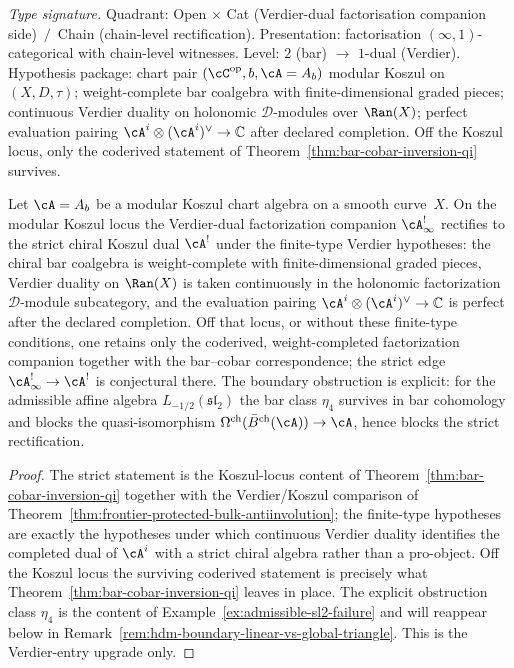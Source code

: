 \begin{proposition}
\label{prop:hdm-upgrade-rectification}
\emph{Type signature.} Quadrant: Open $\times$ Cat (Verdier-dual
factorisation companion side) $\,/\,$ Chain (chain-level rectification).
Presentation: factorisation $(\infty,1)$-categorical with chain-level
witnesses. Level: $2$ (bar) $\to$ $1$-dual (Verdier). Hypothesis
package: chart pair $(\cC^{\mathrm{op}}, b, \cA = A_b)$ modular
Koszul on $(X,D,\tau)$; weight-complete bar coalgebra with
finite-dimensional graded pieces; continuous Verdier duality on
holonomic $\mathcal{D}$-modules over $\Ran(X)$; perfect evaluation
pairing $\cA^i\otimes(\cA^i)^\vee\to\mathbb{C}$ after declared
completion. Off the Koszul locus, only the coderived statement
of Theorem~\textup{\ref{thm:bar-cobar-inversion-qi}} survives.

Let $\cA = A_b$ be a modular Koszul chart algebra on a smooth
curve~$X$. On the modular Koszul locus the Verdier-dual factorization
companion
$\cA^{!}_\infty$ rectifies to the strict chiral Koszul dual
$\cA^!$ under the finite-type Verdier hypotheses: the chiral bar
coalgebra is weight-complete with finite-dimensional graded pieces,
Verdier duality on $\Ran(X)$ is taken continuously in the holonomic
factorization $\mathcal D$-module subcategory, and the evaluation
pairing $\cA^i\otimes(\cA^i)^\vee\to\mathbb C$ is perfect after the
declared completion. Off that locus, or without these finite-type
conditions, one retains only the coderived, weight-completed
factorization companion together with the bar--cobar correspondence;
the strict edge $\cA^{!}_\infty \to \cA^!$ is conjectural there. The
boundary obstruction is explicit: for the admissible affine algebra
$L_{-1/2}(\mathfrak{sl}_2)$ the bar class $\eta_4$ survives in bar
cohomology and blocks the quasi-isomorphism
$\Omega^{\mathrm{ch}}(\bar B^{\mathrm{ch}}(\cA))\to\cA$, hence blocks
the strict rectification.
\end{proposition}

\begin{proof}
The strict statement is the Koszul-locus content of
Theorem~\ref{thm:bar-cobar-inversion-qi} together with the
Verdier/Koszul comparison of
Theorem~\ref{thm:frontier-protected-bulk-antiinvolution}; the
finite-type hypotheses are exactly the hypotheses under which
continuous Verdier duality identifies the completed dual of
$\cA^i$ with a strict chiral algebra rather than a pro-object. Off the
Koszul locus the surviving coderived statement is precisely what
Theorem~\ref{thm:bar-cobar-inversion-qi} leaves in place. The explicit
obstruction class $\eta_4$ is the content of
Example~\ref{ex:admissible-sl2-failure} and will reappear below in
Remark~\ref{rem:hdm-boundary-linear-vs-global-triangle}. This is the
Verdier-entry upgrade only.
\end{proof}

